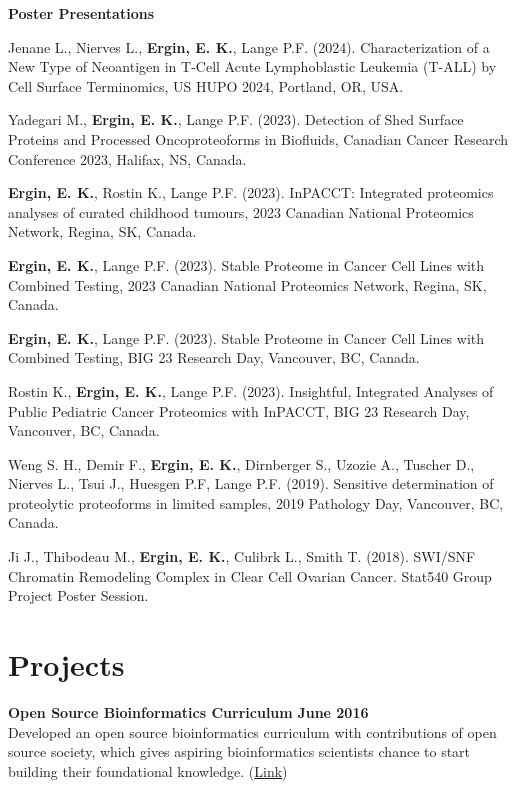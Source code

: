 \documentclass[margin,line]{res}
\begin{document}
\begin{resume}
{\bf Poster Presentations}

\vspace{-.3cm}
Jenane L., Nierves L., {\bf Ergin, E. K.}, Lange P.F. (2024). Characterization of a New Type of Neoantigen in T-Cell Acute Lymphoblastic Leukemia (T-ALL) by Cell Surface Terminomics, US HUPO 2024, Portland, OR, USA.

Yadegari M., {\bf Ergin, E. K.}, Lange P.F. (2023). Detection of Shed Surface Proteins and Processed Oncoproteoforms in Biofluids, Canadian Cancer Research Conference 2023, Halifax, NS, Canada.

{\bf Ergin, E. K.}, Rostin K., Lange P.F. (2023). InPACCT: Integrated proteomics analyses of curated childhood tumours, 2023 Canadian National Proteomics Network, Regina, SK, Canada.

{\bf Ergin, E. K.}, Lange P.F. (2023). Stable Proteome in Cancer Cell Lines with Combined Testing, 2023 Canadian National Proteomics Network, Regina, SK, Canada.

{\bf Ergin, E. K.}, Lange P.F. (2023). Stable Proteome in Cancer Cell Lines with Combined Testing, BIG 23 Research Day, Vancouver, BC, Canada.

Rostin K., {\bf Ergin, E. K.}, Lange P.F. (2023). Insightful, Integrated Analyses of Public Pediatric Cancer Proteomics with InPACCT, BIG 23 Research Day, Vancouver, BC, Canada.

Weng S. H., Demir F., {\bf Ergin, E. K.}, Dirnberger S., Uzozie A., Tuscher D., Nierves L., Tsui J., Huesgen P.F, Lange P.F. (2019). Sensitive determination of proteolytic proteoforms in limited samples, 2019 Pathology Day, Vancouver, BC, Canada.

Ji J., Thibodeau M., {\bf Ergin, E. K.}, Culibrk L., Smith T. (2018). SWI/SNF Chromatin Remodeling Complex in Clear Cell Ovarian Cancer. Stat540 Group Project Poster Session.


\section{\sc Projects}

{\bf Open Source Bioinformatics Curriculum} \hfill {\bf June  2016}\\
Developed an open source bioinformatics curriculum with contributions of open source society, which gives aspiring bioinformatics scientists chance to start building their foundational knowledge. (\href{https://github.com/open-source-society/bioinformatics}{Link})


\end{resume}
\end{document}
